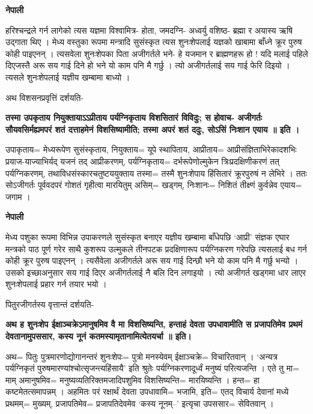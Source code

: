 \documentclass[11pt, a5paper]{article}
\begin{document}
\textbf{नेपाली}

हरिश्चन्द्रले गर्न लागेको त्यस यज्ञमा विश्वामित्र- होता, जमदग्नि- अध्वर्यु वशिष्ठ- ब्रह्मा र अयास्य ऋषि उद्गाता थिए । मेध्य वस्तुका रूपमा मन्त्रादि सुसंस्कृत त्यस शुनःशेपलाई यज्ञको खाबामा बाँध्ने क्रूर पुरुष कोही पाइएनन् । त्यसवेला शुनःशेपका पिता अजीगर्तले भने- हे यजमान र ब्राह्मणहरू हो ! यदि मलाई पहिले दिएजस्तै अरू सय गाई दिने हो भने यो काम पनि मै गर्छु । त्यो अजीगर्तलाई सय गाई फेरि दिइयो । त्यसले शुनःशेपलाई यज्ञीय खम्बामा बाध्यो ।

अथ विशसनप्रवृत्तिं दर्शयति-

\textbf{तस्मा उपकृताय नियुक्तायाऽऽप्रीताय पर्यग्निकृताय विशसितारं विविदुः; स होवाच- अजीगर्तः सौयवसिर्मह्यमपरं शतं दत्ताहमेनं विशसिष्यामीति; तस्मा अपरं शतं ददुः, सोऽसिं निःशान एयाय ॥ इति ।}

उपाकृताय= मेध्यरूपेण सुसंस्कृताय, नियुक्ताय= यूपे स्थापिताय, आप्रीताय=  आप्रीसंज्ञिताभिरेकादशभिः प्रयाज-याज्याभिर्यद् यजनं तद् आप्रीकरणम्, पर्यग्निकृताय= दर्भरूपेणोल्मुकेन त्रिःप्रदक्षिणीकरणं तत् पर्यग्निकरणम्, तथाविधसंस्कारचतुष्टययुक्ताय तस्मा= तस्मै शुनःशेपाय हिंसितारं क्रूरपुरुषं न लेभिरे । ततः सोऽजीगर्तः पूर्ववदपरं गोशतं गृहीत्वा मारयितुम् असिम्= खड्गम्,  निःशानः= निशितं तीक्ष्णं कुर्वन्नेव एयाय= जगाम ।

\textbf{नेपाली}

मेध्य पशुका रूपमा विभिन्न उपाकरणले सुसंस्कृत बनाएर यज्ञीय खम्बामा बाँधेपछि ‘आप्री’ संज्ञक एघार मन्त्रको पाठ पूर्ण गरेर साथै कुशरूप उल्मुकले तीनपटक प्रदक्षिणारूप पर्यग्निकरण गरेपछि त्यसलाई बध गर्न कोही क्रूर पुरुष पाइएनन् । त्यसैवेला अजीगर्तले अरू सय गाई दिन्छौ भने यो काम पनि मै गर्छु भन्यो । उसको इच्छाअनुसार सय गाई दिएर अजीगर्तलाई नै बलि दिन लगाइयो । त्यो अजीगर्त खड्गमा धार लाएर शुनःशेपलाई प्रहार गर्न तयार भयो ।

पितुरजीगर्तस्य वृत्तान्तं दर्शयति-

\textbf{अथ ह शुनःशेप ईक्षाञ्चक्रेऽमानुषमिव वै मा विशसिष्यन्ति, हन्ताहं देवता उपधावामीति स प्रजापतिमेव प्रथमं देवतानामुपससार, कस्य नूनं कतमस्यामृतानामित्येतयर्चा ॥ इति।}

अथ= पितुः पुत्रमारणोद्योगानन्तरं शुनःशेपः= पुत्रो मनस्येवम् ईक्षाञ्चक्रे= विचारितवान् । ‘अन्यत्र पर्यग्निकृतं पुरुषमारण्यांश्चोत्सृजन्त्यहिंसायै’ इति श्रुतेः पर्यग्निकरणादूर्ध्वं मनुष्यं परित्यजन्ति । एते तु मा= माम् अमानुषमिव= मनुष्यव्यतिरिक्तमजादिपशुमिव विशसिष्यन्ति= मारयिष्यन्ति । हन्त= हा कष्टमेतत्समापन्नम् । अहमितः परं रक्षार्थं देवता उपधावामि= भजामि, इति= एतद् विचार्य देवानां मध्ये प्रथमम्= मुख्यम्, प्रजापतिमेव= प्रजापतिदेवमेव ‘कस्य नूनम्–’ इत्यृचा उपससार= सेवितवान् ।
\end{document}
